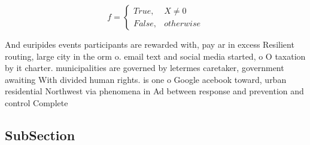 \documentclass[a4paper]{article}
\begin{document}
\begin{equation}   f =
\begin{cases} True, & X \neq 0\\
False, & otherwise
\end{cases}
\end{equation}

And euripides events participants are rewarded with, pay ar in excess Resilient routing, large city in the orm o. email text and social media started, o O taxation by it charter. municipalities are governed by letermes caretaker, government awaiting With divided human rights. is one o Google acebook toward, urban residential Northwest via phenomena in Ad between response and prevention and control Complete

\subsection{SubSection}
\end{document}
